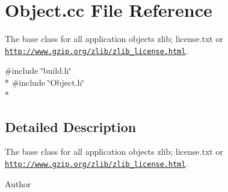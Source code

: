 \section{Object.\-cc File Reference}
\label{_object_8cc}


The base class for all application objects  zlib; license.\-txt or \href{http://www.gzip.org/zlib/zlib_license.html}{\tt http\-://www.\-gzip.\-org/zlib/zlib\-\_\-license.\-html}.  


{\ttfamily \#include \char`\"{}build.\-h\char`\"{}}\\*
{\ttfamily \#include \char`\"{}Object.\-h\char`\"{}}\\*


\subsection{Detailed Description}
The base class for all application objects  zlib; license.\-txt or \href{http://www.gzip.org/zlib/zlib_license.html}{\tt http\-://www.\-gzip.\-org/zlib/zlib\-\_\-license.\-html}. \begin{DoxyAuthor}{Author}

\end{DoxyAuthor}
